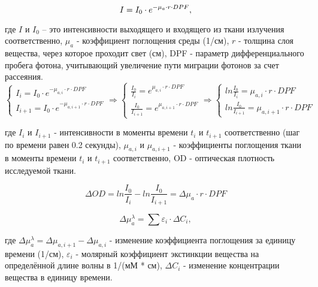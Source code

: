 \begin{equation}\label{blb}
\large{I=I_0\cdot e^{-\mu_a \cdot r \cdot DPF}},
\end{equation}

где $I$ и $I_0$ -- 
это интенсивности выходящего и входящего из ткани излучения соответственно, $\mu_a$ - коэффициент поглощения среды (1/см),  $r$ - толщина слоя вещества, через которое проходит свет (см), DPF - параметр дифференциального пробега фотона, учитывающий увеличение пути миграции фотонов за счет рассеяния. \\

\begin{equation}\label{blb}
\begin{cases}
   {I_i=I_0 \cdot e^{-\mu_{a,i}\cdot r \cdot DPF}}\\
   {I_{i+1}=I_0\cdot e^{-\mu_{a,{i+1}}\cdot r \cdot DPF}}
 \end{cases}
 \Rightarrow
 \begin{cases}
   {\frac{I_0}{I_i}=e^{ \mu_{a,i}\cdot r \cdot DPF}}\\
   {\frac{I_0}{I_{i+1}}=e^{ \mu_{a,{i+1}}\cdot r \cdot DPF}}
 \end{cases}

 \Rightarrow
 \begin{cases}
   {ln{\frac{I_0}{I_i}}=\mu_{a,i}\cdot r\cdot DPF}\\
   {ln{\frac{I_0}{I_{i+1}}}=\mu_{a,{i+1}}\cdot r \cdot DPF}
 \end{cases}
\end{equation}

где $I_i$ и $I_{i+1}$ - интенсивности в моменты времени $t_i$ и $t_{i+1}$ соответственно (шаг по времени равен 0.2 секунды), $\mu_{a,i}$ и $\mu_{a,{i+1}}$ - коэффициенты поглощения ткани в моменты времени $t_i$ и $t_{i+1}$ соответственно, OD - оптическая плотность исследуемой ткани.

\begin{equation}\label{blb}
\Delta OD=ln{\frac{I_0}{I_i}}-ln{\frac{I_0}{I_{i+1}}}=\Delta \mu_a \cdot r \cdot DPF
\end{equation}

\begin{equation}\label{blb}
\Delta \mu_a^{\lambda} =\sum{\varepsilon_i \cdot \Delta C_i},
\end{equation}

где $\Delta \mu_a^{\lambda}=\Delta \mu_{a,i+1}-\Delta \mu_{a,i}$ - изменение коэффициента поглощения за единицу времени (1/см), $\varepsilon_i$ - молярный коэффициент экстинкции вещества на определённой длине волны в 1/(мМ * см), $\Delta C_i$ - изменение концентрации вещества в единицу времени.

